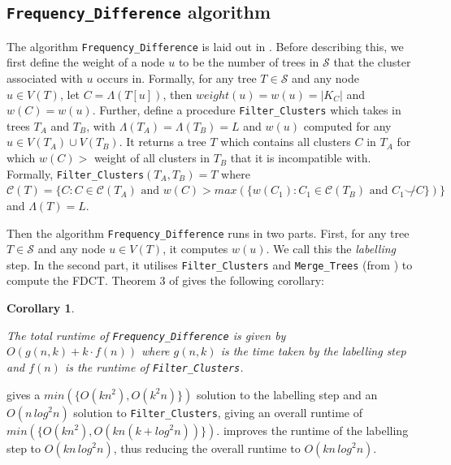 \documentclass{article}
\newcommand{\compatible}{\smile}
\newcommand{\leafset}{\Lambda}
\newtheorem{freqdiffruntimecomponents}[incompatibility]{Corollary}
\begin{document}
    \subsection{\texttt{Frequency\_Difference} algorithm}
    The algorithm \texttt{Frequency\_Difference} is laid out in \cite{jansson2018algorithms}. Before describing this, we first define the weight of a node $u$ to be the number of trees in $\mathcal{S}$ that the cluster associated with $u$ occurs in. Formally, for any tree $T \in \mathcal{S}$ and any node $u \in V(T)$, let $C = \leafset(T[u])$, then $weight(u) = w(u) = |K_C|$ and $w(C) = w(u)$. Further, define a procedure \texttt{Filter\_Clusters} which takes in trees $T_A$ and $T_B$, with $\leafset(T_A) = \leafset(T_B) = L$ and $w(u)$ computed for any $u \in V(T_A) \cup V(T_B)$. It returns a tree $T$ which contains all clusters $C$ in $T_A$ for which $w(C) > $ weight of all clusters in $T_B$ that it is incompatible with. Formally, \texttt{Filter\_Clusters}$(T_A, T_B) = T$ where $\mathcal{C}(T) = \{C : C \in \mathcal{C}(T_A) \text{ and } w(C) > max(\{w(C_1) : C_1 \in \mathcal{C}(T_B) \text{ and } C_1 \not\compatible C\})\}$ and $\leafset(T) = L$.

    Then the algorithm \texttt{Frequency\_Difference} runs in two parts. First, for any tree $T \in \mathcal{S}$ and any node $u \in V(T)$, it computes $w(u)$. We call this the \textit{labelling} step. In the second part, it utilises \texttt{Filter\_Clusters} and \texttt{Merge\_Trees} (from \cite{jansson2016improved}) to compute the FDCT. Theorem 3 of \cite{jansson2018algorithms} gives the following corollary:
    \newline

    \begin{freqdiffruntimecomponents}
        \label{cor:freqdiffruntimecomponents}

        The total runtime of \texttt{Frequency\_Difference} is given by $O(g(n, k) + k \cdot f(n))$ where $g(n, k)$ is the time taken by the labelling step and $f(n)$ is the runtime of \texttt{Filter\_Clusters}.
    \end{freqdiffruntimecomponents}

    \cite{jansson2018algorithms} gives a $min(\{O(kn^2), O(k^2n)\})$ solution to the labelling step and an $O(n\,log^2n)$ solution to \texttt{Filter\_Clusters}, giving an overall runtime of $min(\{O(kn^2), O(kn(k + log^2n))\})$. \cite{gawrychowski2017faster} improves the runtime of the labelling step to $O(kn\,log^2n)$, thus reducing the overall runtime to $O(kn\,log^2n)$.
\end{document}
